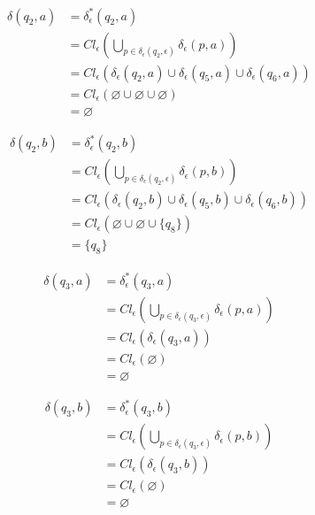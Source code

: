\documentclass{article}
\begin{document}
\begin{enumerate}
{\begin{enumerate}
{					\begin{align*}
						\delta(q_{2}, a) &= \delta^{*}_{\epsilon}(q_{2}, a) \\
						&= Cl_{\epsilon}(\bigcup_{p \in \delta_{\epsilon}(q_{2}, \epsilon)}
						{\delta_{\epsilon}(p, a)}) \\
						&= Cl_{\epsilon}(\delta_{\epsilon}(q_{2}, a) 
						\cup \delta_{\epsilon}(q_{5}, a)
						\cup \delta_{\epsilon}(q_{6}, a))\\
						&= Cl_{\epsilon}(\varnothing \cup \varnothing \cup \varnothing)\\
						&= \varnothing
					\end{align*}

					\begin{align*}
						\delta(q_{2}, b) &= \delta^{*}_{\epsilon}(q_{2}, b) \\
						&= Cl_{\epsilon}(\bigcup_{p \in \delta_{\epsilon}(q_{2}, \epsilon)}
						{\delta_{\epsilon}(p, b)}) \\
						&= Cl_{\epsilon}(\delta_{\epsilon}(q_{2}, b) 
						\cup \delta_{\epsilon}(q_{5}, b)
						\cup \delta_{\epsilon}(q_{6}, b))\\
						&= Cl_{\epsilon}(\varnothing \cup \varnothing \cup \{q_{8}\})\\
						&= \{q_{8}\}
					\end{align*}

					\begin{align*}
						\delta(q_{3}, a) &= \delta^{*}_{\epsilon}(q_{3}, a) \\
						&= Cl_{\epsilon}(\bigcup_{p \in \delta_{\epsilon}(q_{3}, \epsilon)}
						{\delta_{\epsilon}(p, a)}) \\
						&= Cl_{\epsilon}(\delta_{\epsilon}(q_{3}, a))\\
						&= Cl_{\epsilon}(\varnothing)\\
						&= \varnothing
					\end{align*}

					\begin{align*}
						\delta(q_{3}, b) &= \delta^{*}_{\epsilon}(q_{3}, b) \\
						&= Cl_{\epsilon}(\bigcup_{p \in \delta_{\epsilon}(q_{3}, \epsilon)}
						{\delta_{\epsilon}(p, b)}) \\
						&= Cl_{\epsilon}(\delta_{\epsilon}(q_{3}, b))\\
						&= Cl_{\epsilon}(\varnothing)\\
						&= \varnothing
					\end{align*}

}
\end{enumerate}}
\end{enumerate}
\end{document}
